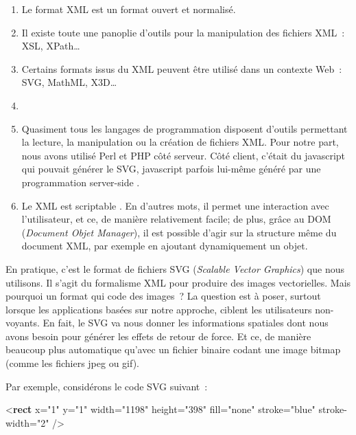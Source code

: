 \documentclass[
]{book}
\newenvironment{Shaded}{\begin{snugshade}}{\end{snugshade}}
\newcommand{\KeywordTok}[1]{\textcolor[rgb]{0.13,0.29,0.53}{\textbf{#1}}}
\newcommand{\NormalTok}[1]{#1}
\newcommand{\OtherTok}[1]{\textcolor[rgb]{0.56,0.35,0.01}{#1}}
\newcommand{\StringTok}[1]{\textcolor[rgb]{0.31,0.60,0.02}{#1}}
\providecommand{\tightlist}{%
  \setlength{\itemsep}{0pt}\setlength{\parskip}{0pt}}
\begin{document}
\begin{enumerate}
\def\labelenumi{\arabic{enumi}.}
\item
  Le format XML est un format ouvert et
  normalisé.
\item
  Il existe toute une panoplie d'outils pour la
  manipulation des fichiers XML~: XSL, XPath\ldots{}
\item
  Certains formats issus du XML peuvent être utilisé
  dans un contexte Web~: SVG, MathML, X3D\ldots{}
\item
\item
  Quasiment tous les langages de programmation
  disposent d'outils permettant la lecture, la manipulation ou la création de
  fichiers XML. Pour notre part, nous avons utilisé Perl et PHP côté serveur.
  Côté client, c'était du javascript qui pouvait générer le SVG, javascript
  parfois lui-même généré par une programmation server-side .
\item
  Le XML est scriptable . En d'autres mots, il
  permet une interaction avec l'utilisateur, et ce, de manière relativement
  facile; de plus, grâce au DOM (\emph{Document Objet Manager}), il est
  possible d'agir sur la structure même du document XML, par exemple en
  ajoutant dynamiquement un objet.
\end{enumerate}

En pratique, c'est le format de fichiers SVG (\emph{Scalable Vector
Graphics}) que nous utilisons. Il s'agit du formalisme XML pour produire
des images vectorielles. Mais pourquoi un format qui code des images~?
La question est à poser, surtout lorsque les applications basées sur notre
approche, ciblent les utilisateurs non-voyants. En fait, le SVG va nous
donner les informations spatiales dont nous avons besoin pour générer les
effets de retour de force. Et ce, de manière beaucoup plus automatique
qu'avec un fichier binaire codant une image bitmap (comme les fichiers jpeg
ou gif).

Par exemple, considérons le code SVG suivant~:

\begin{Shaded}
\begin{Highlighting}[]
\NormalTok{\textless{}}\KeywordTok{rect}\OtherTok{ x=}\StringTok{"1"}\OtherTok{ y=}\StringTok{"1"}
\OtherTok{      width=}\StringTok{"1198"}\OtherTok{ height=}\StringTok{"398"}
\OtherTok{      fill=}\StringTok{"none"}\OtherTok{ stroke=}\StringTok{"blue"}
\OtherTok{      stroke{-}width=}\StringTok{"2"}\NormalTok{ /\textgreater{}}
\end{Highlighting}
\end{Shaded}
\end{document}
